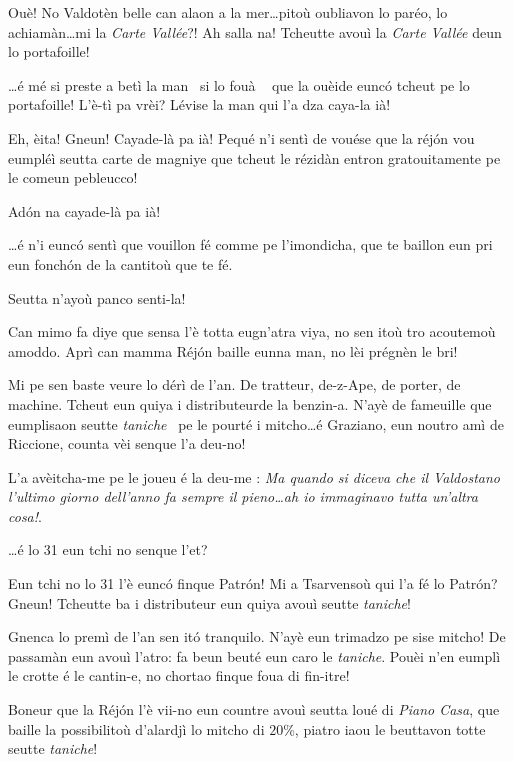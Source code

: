 \begin{drama}
\Laurentspeaks Ouè! No Valdotèn belle can alaon a la mer\ldots pitoù oubliavon lo paréo, lo achiamàn\ldots mi la \textit{Carte Vallée}?! Ah salla na! Tcheutte avouì la \textit{Carte Vallée} deun lo portafoille!

\Pierrespeaks \ldots é mé si preste a betì la man \man\ si lo fouà \foua\  que la ouèide eunc\'o tcheut pe lo portafoille! L'è-tì pa vrèi? Lévise la man qui l'a dza caya-la ià! 

\Laurentspeaks Eh, èita! Gneun! Cayade-là pa ià! Pequé n'i sentì de vouése que la réj\'on vou eumpléì seutta carte de magniye que tcheut le rézidàn entron gratouitamente pe le comeun pebleucco!

\Pierrespeaks Ad\'on na cayade-là pa ià!

\Laurentspeaks \ldots é n'i eunc\'o sentì que vouillon fé comme pe l'imondicha, que te baillon eun pri eun fonch\'on de la cantitoù que te fé.

\Pierrespeaks Seutta n'ayoù panco senti-la!

\Laurentspeaks Can mimo fa diye que sensa l'è totta eugn'atra viya, no sen itoù tro acoutemoù amoddo. Aprì can mamma Réj\'on baille eunna man, no lèi prégnèn le bri!

\Pierrespeaks Mi pe sen baste veure lo dérì de l'an. De tratteur, de-z-Ape, de porter, de machine. Tcheut eun quiya i distributeur\distributeur de la benzin-a. N'ayè de fameuille que eumplisaon seutte \textit{taniche} \tanica\ pe le pourté i mitcho\ldots é Graziano, eun noutro amì de Riccione,  counta vèi senque l'a deu-no!

\Laurentspeaks L'a avèitcha-me pe le joueu é la deu-me : \og\textit{Ma quando si diceva che il Valdostano l'ultimo giorno dell'anno fa sempre il pieno\ldots ah io immaginavo tutta un'altra cosa!}\fg.

\Pierrespeaks \ldots é lo 31 eun tchi no senque l'et?

\Laurentspeaks Eun tchi no lo 31 l'è eunc\'o finque Patr\'on! Mi a Tsarvensoù qui l'a fé lo Patr\'on? Gneun! Tcheutte ba i distributeur eun quiya avouì seutte \textit{taniche}!

\Pierrespeaks Gnenca lo premì de l'an sen it\'o tranquilo. N'ayè eun trimadzo pe sise mitcho! De passamàn eun avouì l'a\-tro: fa beun beuté eun caro le \textit{taniche}. Pouèi n'en eumplì le crotte é le cantin-e, no chortao finque foua di fin-itre!

\Laurentspeaks Boneur que la Réj\'on l'è vii-no eun countre avouì seutta loué di \textit{Piano Casa}, que baille la possibilitoù d'alardjì lo mitcho di $20\%$, piatro iaou le beuttavon totte seutte \textit{taniche}!


\end{drama}
